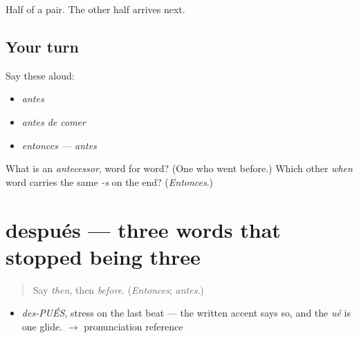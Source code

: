 \begin{grammarlens}[title={What you've built}]
Half of a pair. The other half arrives next.
\end{grammarlens}

\subsection*{Your turn}
Say these aloud:

\begin{itemize}
\raggedright
  \item \emph{antes}
  \item \emph{antes de comer}
  \item \emph{entonces — antes}
\end{itemize}

\begin{tcolorbox}[breakable,colback=teal!4,colframe=teal!35!black,title={Before you move on}]
What is an \emph{antecessor}, word for word? (One who went before.) Which other \emph{when} word carries the same \emph{-s} on the end? (\emph{Entonces}.)
\end{tcolorbox}
\section[después]{después — three words that stopped being three}

\label{lesson:ES-C323-despues}



\begin{quote}
Say \emph{then}, then \emph{before}. (\emph{Entonces}; \emph{antes}.)
\end{quote}

\begin{sounds}
\begin{itemize}
\raggedright
  \item \emph{des-PUÉS}, stress on the last beat — the written accent says so, and the \emph{ué} is one glide. $\to$ pronunciation reference
\end{itemize}
\end{sounds}

